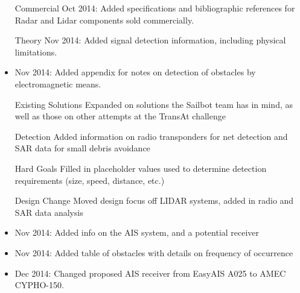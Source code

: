 \begin{itemize}
\item[Commercial] Oct 2014: Added specifications and bibliographic references for Radar and Lidar components sold commercially.
\item[Theory] Nov 2014: Added signal detection information, including physical limitations.
\item Nov 2014: Added appendix for notes on detection of obstacles by electromagnetic means.
\item[Existing Solutions] Expanded on solutions the Sailbot team has in mind, as well as those on other attempts at the TransAt challenge
\item[Detection] Added information on radio transponders for net detection and SAR data for small debris avoidance
\item[Hard Goals] Filled in placeholder values used to determine detection requirements (size, speed, distance, etc.)
\item[Design Change] Moved design focus off LIDAR systems, added in radio and SAR data analysis
\item Nov 2014: Added info on the AIS system, and a potential receiver
\item Nov 2014: Added table of obstacles with details on frequency of occurrence
\item Dec 2014: Changed proposed AIS receiver from EasyAIS A025 to AMEC CYPHO-150.
\end{itemize}